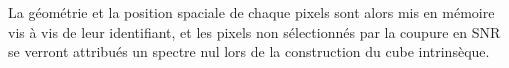 \documentclass[../main/main.tex]{subfiles}
\begin{document}

La géométrie et la position spaciale de chaque pixels sont alors mis en
mémoire vis à vis de leur identifiant, et les pixels non sélectionnés
par la coupure en SNR se verront attribués un spectre nul lors de la construction du cube intrinsèque.
\end{document}
